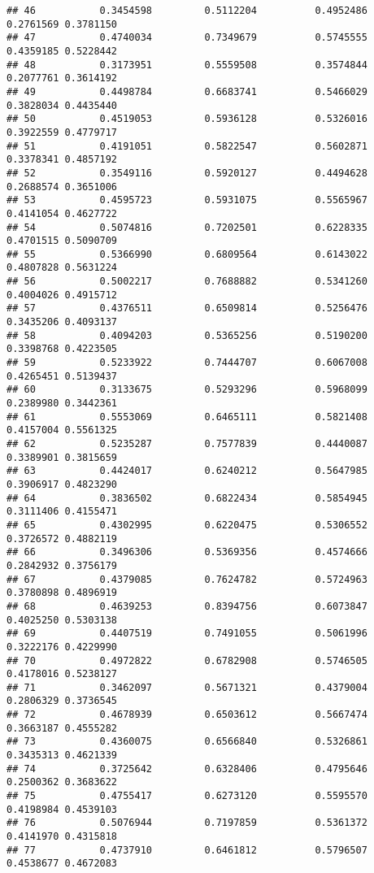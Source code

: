 \documentclass[]{article}
\begin{document}
\begin{verbatim}
## 46           0.3454598         0.5112204          0.4952486 0.2761569 0.3781150
## 47           0.4740034         0.7349679          0.5745555 0.4359185 0.5228442
## 48           0.3173951         0.5559508          0.3574844 0.2077761 0.3614192
## 49           0.4498784         0.6683741          0.5466029 0.3828034 0.4435440
## 50           0.4519053         0.5936128          0.5326016 0.3922559 0.4779717
## 51           0.4191051         0.5822547          0.5602871 0.3378341 0.4857192
## 52           0.3549116         0.5920127          0.4494628 0.2688574 0.3651006
## 53           0.4595723         0.5931075          0.5565967 0.4141054 0.4627722
## 54           0.5074816         0.7202501          0.6228335 0.4701515 0.5090709
## 55           0.5366990         0.6809564          0.6143022 0.4807828 0.5631224
## 56           0.5002217         0.7688882          0.5341260 0.4004026 0.4915712
## 57           0.4376511         0.6509814          0.5256476 0.3435206 0.4093137
## 58           0.4094203         0.5365256          0.5190200 0.3398768 0.4223505
## 59           0.5233922         0.7444707          0.6067008 0.4265451 0.5139437
## 60           0.3133675         0.5293296          0.5968099 0.2389980 0.3442361
## 61           0.5553069         0.6465111          0.5821408 0.4157004 0.5561325
## 62           0.5235287         0.7577839          0.4440087 0.3389901 0.3815659
## 63           0.4424017         0.6240212          0.5647985 0.3906917 0.4823290
## 64           0.3836502         0.6822434          0.5854945 0.3111406 0.4155471
## 65           0.4302995         0.6220475          0.5306552 0.3726572 0.4882119
## 66           0.3496306         0.5369356          0.4574666 0.2842932 0.3756179
## 67           0.4379085         0.7624782          0.5724963 0.3780898 0.4896919
## 68           0.4639253         0.8394756          0.6073847 0.4025250 0.5303138
## 69           0.4407519         0.7491055          0.5061996 0.3222176 0.4229990
## 70           0.4972822         0.6782908          0.5746505 0.4178016 0.5238127
## 71           0.3462097         0.5671321          0.4379004 0.2806329 0.3736545
## 72           0.4678939         0.6503612          0.5667474 0.3663187 0.4555282
## 73           0.4360075         0.6566840          0.5326861 0.3435313 0.4621339
## 74           0.3725642         0.6328406          0.4795646 0.2500362 0.3683622
## 75           0.4755417         0.6273120          0.5595570 0.4198984 0.4539103
## 76           0.5076944         0.7197859          0.5361372 0.4141970 0.4315818
## 77           0.4737910         0.6461812          0.5796507 0.4538677 0.4672083

\end{verbatim}
\end{document}
